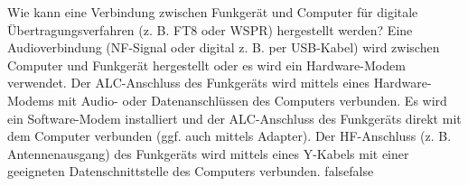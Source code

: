     {Wie kann eine Verbindung zwischen Funkgerät und Computer für digitale Übertragungsverfahren (z. B. FT8 oder WSPR) hergestellt werden?}
    {Eine Audioverbindung (NF-Signal oder digital z. B. per USB-Kabel) wird zwischen Computer und Funkgerät hergestellt oder es wird ein Hardware-Modem verwendet.}
    {Der ALC-Anschluss des Funkgeräts wird mittels eines Hardware-Modems mit Audio- oder Datenanschlüssen des Computers verbunden.}
    {Es wird ein Software-Modem installiert und der ALC-Anschluss des Funkgeräts direkt mit dem Computer verbunden (ggf. auch mittels Adapter).}
    {Der HF-Anschluss (z. B. Antennenausgang) des Funkgeräts wird mittels eines Y-Kabels mit einer geeigneten Datenschnittstelle des Computers verbunden.}
    {false}{false}
